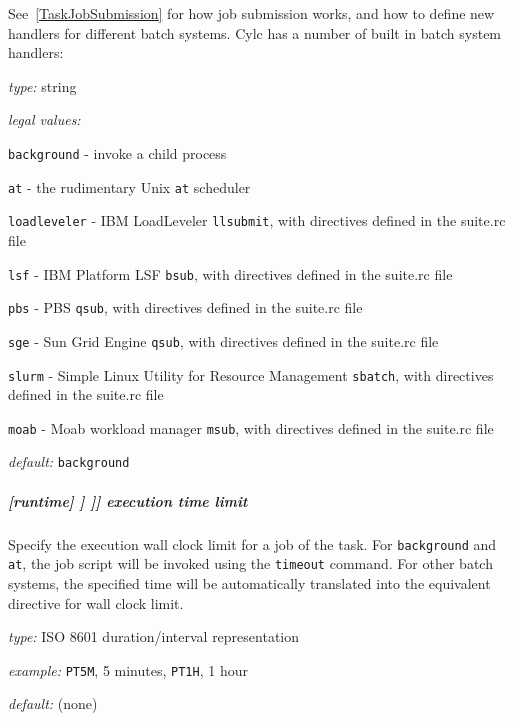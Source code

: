 See~\ref{TaskJobSubmission} for how job submission works, and how to define
new handlers for different batch systems. Cylc has a number of built in batch system handlers:
\begin{myitemize}
\item {\em type:} string
\item {\em legal values:}
   \begin{myitemize}
       \item \lstinline=background= - invoke a child process
       \item \lstinline=at= - the rudimentary Unix \lstinline=at= scheduler
       \item \lstinline=loadleveler= - IBM LoadLeveler \lstinline=llsubmit=, with directives defined in the suite.rc file
       \item \lstinline=lsf= - IBM Platform LSF \lstinline=bsub=, with directives defined in the suite.rc file
       \item \lstinline=pbs= - PBS \lstinline=qsub=, with directives defined in the suite.rc file
       \item \lstinline=sge= - Sun Grid Engine \lstinline=qsub=, with directives defined in the suite.rc file
       \item \lstinline=slurm= - Simple Linux Utility for Resource Management \lstinline=sbatch=, with directives defined in the suite.rc file
       \item \lstinline=moab= - Moab workload manager \lstinline=msub=, with directives defined in the suite.rc file
   \end{myitemize}
\item {\em default:} \lstinline=background=
\end{myitemize}

\subparagraph[execution time limit]{[runtime] \textrightarrow [[\_\_NAME\_\_]] \textrightarrow [[[job]]] \textrightarrow execution time limit}

Specify the execution wall clock limit for a job of the task.
For \lstinline=background= and \lstinline=at=, the job script will be invoked using the \lstinline=timeout= command.
For other batch systems, the specified time will be automatically translated into the equivalent directive for wall clock limit.

\begin{myitemize}
    \item {\em type:} ISO 8601 duration/interval representation
    \item {\em example:} \lstinline=PT5M=, 5 minutes, \lstinline=PT1H=, 1 hour
    \item {\em default:} (none)
\end{myitemize}

